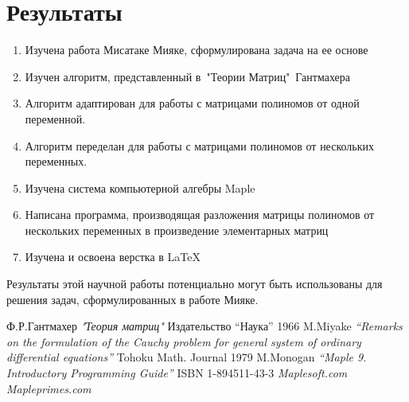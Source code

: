 \documentclass[14pt, a4paper]{extreport}
\begin{document}
\section{Результаты}
\begin{enumerate}
	\item Изучена работа \cite{miyake} Мисатаке Мияке, сформулирована задача на ее основе
	\item Изучен алгоритм, представленный в\ "Теории Матриц"\ Гантмахера \cite{gantmaher}
	\item Алгоритм адаптирован для работы с матрицами полиномов от одной переменной.
	\item Алгоритм переделан для работы с матрицами полиномов от нескольких переменных.
	\item Изучена система компьютерной алгебры Maple
	\item Написана программа, производящая разложения матрицы полиномов от нескольких переменных в произведение элементарных матриц
	\item Изучена и освоена верстка в LaTeX
\end{enumerate}
Результаты этой научной работы потенциально могут быть использованы
для решения задач, сформулированных в работе \cite{miyake} Мияке.
\begin{thebibliography}{5}
		Ф.Р.Гантмахер
		\textit{"Теория матриц"}
		Издательство “Наука” 1966
		M.Miyake
		\textit{“Remarks on the formulation of the Cauchy problem
		for general system of ordinary differential equations”}
		Tohoku Math. Journal 1979
		M.Monogan
		\textit{“Maple 9. Introductory Programming Guide”}
		ISBN 1-894511-43-3
		\textit{Maplesoft.com}
		\textit{Mapleprimes.com}
\end{thebibliography}
\end{document}
